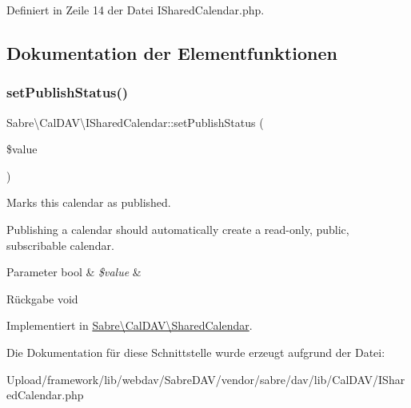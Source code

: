 Definiert in Zeile 14 der Datei I\+Shared\+Calendar.\+php.



\subsection{Dokumentation der Elementfunktionen}
\mbox{\label{interface_sabre_1_1_cal_d_a_v_1_1_i_shared_calendar_ae4570744db00653320964124880c8f93}} 
\subsubsection{\texorpdfstring{set\+Publish\+Status()}{setPublishStatus()}}
{\footnotesize\ttfamily Sabre\textbackslash{}\+Cal\+D\+A\+V\textbackslash{}\+I\+Shared\+Calendar\+::set\+Publish\+Status (\begin{DoxyParamCaption}\item[{}]{\$value }\end{DoxyParamCaption})}

Marks this calendar as published.

Publishing a calendar should automatically create a read-\/only, public, subscribable calendar.


\begin{DoxyParams}[1]{Parameter}
bool & {\em \$value} & \\
\hline
\end{DoxyParams}
\begin{DoxyReturn}{Rückgabe}
void 
\end{DoxyReturn}


Implementiert in \mbox{\hyperlink{class_sabre_1_1_cal_d_a_v_1_1_shared_calendar_afb4a48cd8825815b3bca60b342fb3dec}{Sabre\textbackslash{}\+Cal\+D\+A\+V\textbackslash{}\+Shared\+Calendar}}.



Die Dokumentation für diese Schnittstelle wurde erzeugt aufgrund der Datei\+:\begin{DoxyCompactItemize}
\item 
Upload/framework/lib/webdav/\+Sabre\+D\+A\+V/vendor/sabre/dav/lib/\+Cal\+D\+A\+V/I\+Shared\+Calendar.\+php\end{DoxyCompactItemize}
